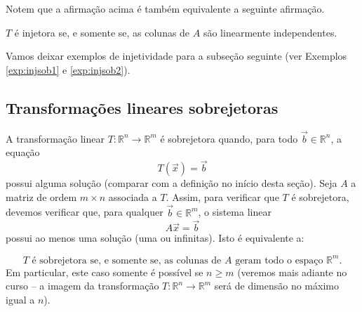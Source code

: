 \documentclass[../livro.tex]{subfiles}
\begin{document}
Notem que a afirmação acima é também equivalente a seguinte afirmação.


\begin{claim}
  $T$ é injetora se, e somente se, as colunas de $A$ são linearmente independentes.
\end{claim}

Vamos deixar exemplos de injetividade para a subseção seguinte (ver Exemplos \ref{exp:injsob1} e \ref{exp:injsob2}).

\subsection{Transformações lineares sobrejetoras}

A transformação linear $T: \mathbb{R}^n \to \mathbb{R}^m$ é sobrejetora quando, para todo $\vec{b} \in \mathbb{R}^n$, a equação
\begin{equation}
T(\vec{x}) = \vec{b}
\end{equation} possui alguma solução (comparar com a definição no início desta seção). Seja $A$ a matriz de ordem $m\times n$ associada a $T$. Assim, para verificar que $T$ é sobrejetora, devemos verificar que, para qualquer $\vec{b} \in \mathbb{R}^m$, o sistema linear
\begin{equation}
A\vec{x} = \vec{b}
\end{equation} possui ao menos uma solução (uma ou infinitas). Isto é equivalente a:


\begin{equation}
\boxed{\text{$T$ é sobrejetora se, e somente se, as colunas de $A$ geram todo o espaço $\mathbb{R}^m$.}}
\end{equation} Em particular, este caso somente é possível se $n \ge m$ (veremos mais adiante no curso -- a imagem da transformação $T: \mathbb{R}^n \to \mathbb{R}^m$ será de dimensão no máximo igual a $n$).
\end{document}

